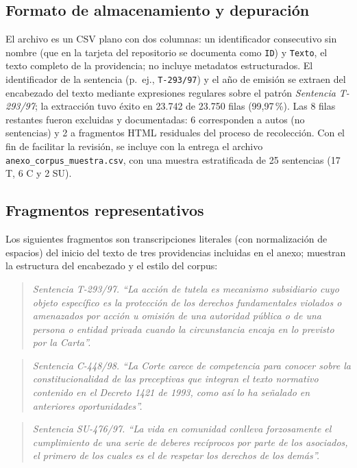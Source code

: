 \documentclass[stu,12pt,spanish,floatsintext,natbib]{apa7}
\begin{document}
\subsection{Formato de almacenamiento y depuración}
El archivo es un CSV plano con dos columnas: un identificador consecutivo
sin nombre (que en la tarjeta del repositorio se documenta como
\texttt{ID}) y \texttt{Texto}, el texto completo de la providencia; no
incluye metadatos estructurados. El identificador de la sentencia (p.~ej.,
\texttt{T-293/97}) y el año de emisión se extraen del encabezado del
texto mediante expresiones regulares sobre el patrón \emph{Sentencia
T-293/97}; la extracción tuvo éxito en 23.742 de 23.750 filas (99,97\,\%).
Las 8 filas restantes fueron excluidas y documentadas: 6 corresponden a
autos (no sentencias) y 2 a fragmentos HTML residuales del proceso de
recolección. Con el fin de facilitar la revisión, se incluye con la
entrega el archivo \texttt{anexo\_corpus\_muestra.csv}, con una muestra
estratificada de 25 sentencias (17 T, 6 C y 2 SU).

\subsection{Fragmentos representativos}
Los siguientes fragmentos son transcripciones literales (con normalización
de espacios) del inicio del texto de tres providencias incluidas en el
anexo; muestran la estructura del encabezado y el estilo del corpus:

\begin{quote}\itshape
\textit{Sentencia T-293/97.} ``La acción de tutela es mecanismo subsidiario
cuyo objeto específico es la protección de los derechos fundamentales
violados o amenazados por acción u omisión de una autoridad pública o de
una persona o entidad privada cuando la circunstancia encaja en lo
previsto por la Carta''.
\end{quote}

\begin{quote}\itshape
\textit{Sentencia C-448/98.} ``La Corte carece de competencia para conocer
sobre la constitucionalidad de las preceptivas que integran el texto
normativo contenido en el Decreto 1421 de 1993, como así lo ha señalado
en anteriores oportunidades''.
\end{quote}

\begin{quote}\itshape
\textit{Sentencia SU-476/97.} ``La vida en comunidad conlleva
forzosamente el cumplimiento de una serie de deberes recíprocos por parte
de los asociados, el primero de los cuales es el de respetar los derechos
de los demás''.
\end{quote}
\end{document}
